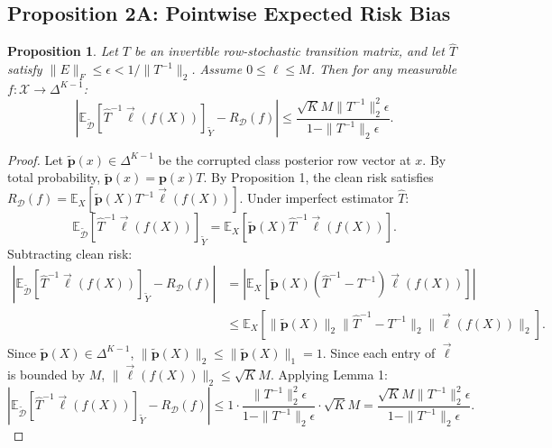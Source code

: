 \documentclass[11pt,onecolumn]{article}
\newtheorem{proposition}{Proposition}
\begin{document}
\subsection{Proposition 2A: Pointwise Expected Risk Bias}
\begin{proposition}
Let $T$ be an invertible row-stochastic transition matrix, and let $\hat{T}$ satisfy $\|E\|_F \le \epsilon < 1/\|T^{-1}\|_2$. Assume $0 \le \ell \le M$. Then for any measurable $f: \mathcal{X} \to \Delta^{K-1}$:
\begin{equation}
\left| \mathbb{E}_{\tilde{\mathcal{D}}} [\hat{T}^{-1} \vec{\ell}(f(X))]_{\tilde{Y}} - R_{\mathcal{D}}(f) \right| \le \frac{\sqrt{K} M \|T^{-1}\|_2^2 \epsilon}{1 - \|T^{-1}\|_2 \epsilon}.
\end{equation}
\end{proposition}
\begin{proof}
Let $\tilde{\mathbf{p}}(x) \in \Delta^{K-1}$ be the corrupted class posterior row vector at $x$. By total probability, $\tilde{\mathbf{p}}(x) = \mathbf{p}(x) T$. By Proposition 1, the clean risk satisfies $R_{\mathcal{D}}(f) = \mathbb{E}_X [\tilde{\mathbf{p}}(X) T^{-1} \vec{\ell}(f(X))]$.
Under imperfect estimator $\hat{T}$:
\begin{equation}
\mathbb{E}_{\tilde{\mathcal{D}}} [\hat{T}^{-1} \vec{\ell}(f(X))]_{\tilde{Y}} = \mathbb{E}_X [\tilde{\mathbf{p}}(X) \hat{T}^{-1} \vec{\ell}(f(X))].
\end{equation}
Subtracting clean risk:
\begin{align}
\left| \mathbb{E}_{\tilde{\mathcal{D}}} [\hat{T}^{-1} \vec{\ell}(f(X))]_{\tilde{Y}} - R_{\mathcal{D}}(f) \right| &= \left| \mathbb{E}_X \left[ \tilde{\mathbf{p}}(X) (\hat{T}^{-1} - T^{-1}) \vec{\ell}(f(X)) \right] \right| \\
&\le \mathbb{E}_X \left[ \|\tilde{\mathbf{p}}(X)\|_2 \|\hat{T}^{-1} - T^{-1}\|_2 \|\vec{\ell}(f(X))\|_2 \right].
\end{align}
Since $\tilde{\mathbf{p}}(X) \in \Delta^{K-1}$, $\|\tilde{\mathbf{p}}(X)\|_2 \le \|\tilde{\mathbf{p}}(X)\|_1 = 1$. Since each entry of $\vec{\ell}$ is bounded by $M$, $\|\vec{\ell}(f(X))\|_2 \le \sqrt{K} M$.
Applying Lemma 1:
\begin{equation}
\left| \mathbb{E}_{\tilde{\mathcal{D}}} [\hat{T}^{-1} \vec{\ell}(f(X))]_{\tilde{Y}} - R_{\mathcal{D}}(f) \right| \le 1 \cdot \frac{\|T^{-1}\|_2^2 \epsilon}{1 - \|T^{-1}\|_2 \epsilon} \cdot \sqrt{K} M = \frac{\sqrt{K} M \|T^{-1}\|_2^2 \epsilon}{1 - \|T^{-1}\|_2 \epsilon}.
\end{equation}
\end{proof}
\end{document}
